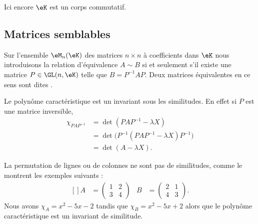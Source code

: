 Ici encore \( \eK\) est un corps commutatif.

\subsection{Matrices semblables}

\begin{definition} \label{DefCQNFooSDhDpB}
    Sur l'ensemble \( \eM_n(\eK)\) des matrices \( n\times n\) à coefficients dans \(\eK\) nous introduisons la relation d'équivalence \( A\sim B\) si et seulement s'il existe une matrice \( P\in\GL(n,\eK)\) telle que \( B=P^{-1}AP\). Deux matrices équivalentes en ce sens sont dites .
\end{definition}

Le polynôme caractéristique est un invariant sous les similitudes. En effet si \( P\) est une matrice inversible,
\begin{subequations}
    \begin{align}
        \chi_{PAP^{-1}}&=\det(PAP^{-1}-\lambda X)\\
        &=\det\big( P^{-1}(PAP^{-1}-\lambda X)P^{-1} \big)\\
        &=\det(A-\lambda X).
    \end{align}
\end{subequations}

La permutation de lignes ou de colonnes ne sont pas de similitudes, comme le montrent les exemples suivants :
\begin{equation}
    \begin{aligned}[]
        A&=\begin{pmatrix}
            1    &   2    \\ 
            3    &   4    
        \end{pmatrix}&
        B&=\begin{pmatrix}
            2    &   1    \\ 
            4    &   3    
        \end{pmatrix}.
    \end{aligned}
\end{equation}
Nous avons \( \chi_A=x^2-5x-2\) tandis que \( \chi_B=x^2-5x+2\) alors que le polynôme caractéristique est un invariant de similitude.

